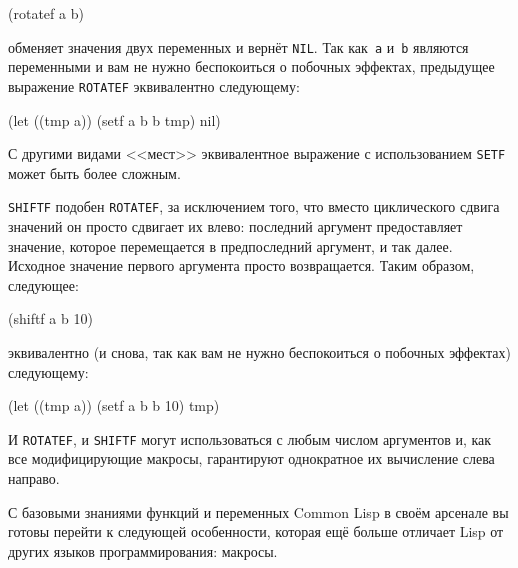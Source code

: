 \begin{myverb}
(rotatef a b)
\end{myverb}

\noindent{}обменяет значения двух переменных и вернёт \lstinline{NIL}. Так
как~\lstinline{a} и~\lstinline{b} являются переменными и вам не нужно беспокоиться о
побочных эффектах, предыдущее выражение \lstinline{ROTATEF} эквивалентно следующему:

\begin{myverb}
(let ((tmp a)) (setf a b b tmp) nil)
\end{myverb}

С другими видами <<мест>> эквивалентное выражение с использованием \lstinline{SETF} может быть
более сложным.

\lstinline{SHIFTF} подобен \lstinline{ROTATEF}, за исключением того, что вместо циклического
сдвига значений он просто сдвигает их влево: последний аргумент предоставляет значение,
которое перемещается в предпоследний аргумент, и так далее. Исходное значение первого
аргумента просто возвращается. Таким образом, следующее:

\begin{myverb}
(shiftf a b 10)
\end{myverb}

\noindent{}эквивалентно (и снова, так как вам не нужно беспокоиться о побочных эффектах) следующему:

\begin{myverb}
(let ((tmp a)) (setf a b b 10) tmp)
\end{myverb}

И \lstinline{ROTATEF}, и \lstinline{SHIFTF} могут использоваться с любым числом аргументов и,
как все модифицирующие макросы, гарантируют однократное их вычисление слева направо.

С базовыми знаниями функций и переменных Common Lisp в своём арсенале вы готовы перейти к
следующей особенности, которая ещё больше отличает Lisp от других языков программирования:
макросы.

